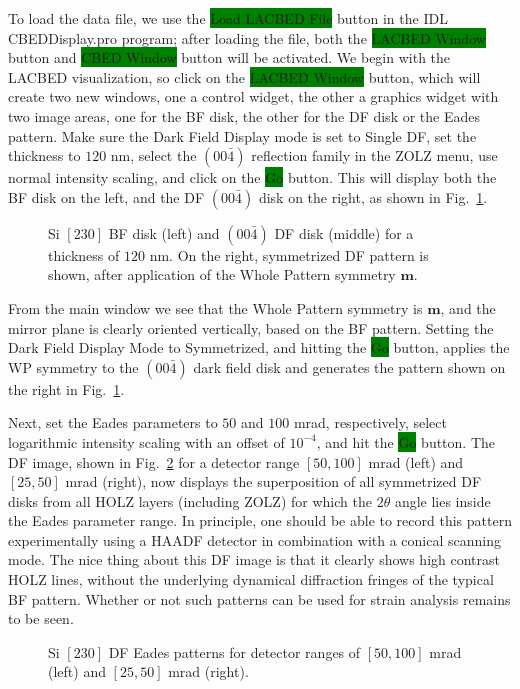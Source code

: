 \documentclass[DIV=calc, paper=letter, fontsize=11pt]{scrartcl}	 %
\newcommand{\button}[1]{\colorbox{green}{\textsf{#1}} button}
\begin{document}
To load the data file, we use the \button{Load LACBED File} in the IDL \textsf{CBEDDisplay.pro} program; after loading the file, 
both the \button{LACBED Window} and \button{CBED Window} will be activated.  We begin with the LACBED visualization, so click on
the \button{LACBED Window}, which will create two new windows, one a control widget, the other a graphics widget with two image areas,
one for the BF disk, the other for the DF disk or the Eades pattern.  Make sure the Dark Field Display mode
is set to Single DF, set the thickness to $120$ nm, select the $(00\bar{4})$ reflection family
in the ZOLZ menu, use normal intensity scaling, and click on the \button{Go}.  This will display both the BF disk on the left,
and the DF $(00\bar{4})$ disk on the right, as shown in Fig.~\ref{fig:ex2}.

\begin{figure}[h]
\leavevmode\centering
{}
\caption{\label{fig:ex2}Si $[230]$ BF disk (left) and $(00\bar{4})$ DF disk (middle) for a thickness of $120$ nm.  On the right, symmetrized DF
pattern is shown, after application of the Whole Pattern symmetry $\mathbf{m}$.}
\end{figure}

From the main window we see that the Whole Pattern symmetry is $\mathbf{m}$, and the mirror plane is clearly oriented vertically,
based on the BF pattern.  Setting the Dark Field Display Mode to Symmetrized, and hitting the \button{Go}, applies the WP symmetry to
the $(00\bar{4})$ dark field disk and generates the pattern shown on the right in Fig.~\ref{fig:ex2}.

Next, set the Eades parameters to $50$ and $100$ mrad, respectively, select logarithmic intensity scaling with an offset of $10^{-4}$, 
and hit the \button{Go}.  The DF image, shown in Fig.~\ref{fig:ex3} for a detector range $[50,100]$ mrad (left) and $[25,50]$ mrad (right),
now displays the superposition of all symmetrized DF disks from all HOLZ layers (including ZOLZ) for which 
the $2\theta$ angle lies inside the Eades parameter range.  In principle, one should be able to record this pattern experimentally 
using a HAADF detector in combination with a conical scanning mode.  The nice thing about this DF image is that it clearly shows high
contrast HOLZ lines, without the underlying dynamical diffraction fringes of the typical BF pattern.  Whether or not such patterns can
be used for strain analysis remains to be seen.

\begin{figure}[h]
\leavevmode\centering
{}
\caption{\label{fig:ex3}Si $[230]$ DF Eades patterns for detector ranges of $[50,100]$ mrad (left) and $[25,50]$ mrad (right).}
\end{figure}
\end{document}

